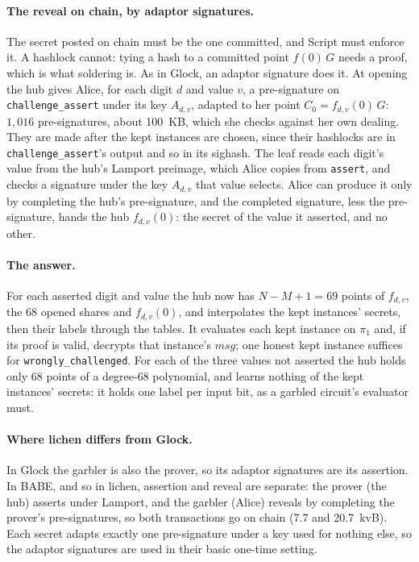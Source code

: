 \documentclass[11pt]{article}
\newcommand{\tx}[1]{\texttt{#1}}
\begin{document}
\paragraph{The reveal on chain, by adaptor signatures.} The secret
posted on chain must be the one committed, and Script must enforce it.
A hashlock cannot: tying a hash to a committed point $f(0)\,G$ needs a
proof, which is what soldering is. As in Glock, an adaptor signature
does it. At opening the hub gives Alice, for each digit $d$ and value
$v$, a pre-signature on \tx{challenge\_assert} under its key $A_{d,v}$,
adapted to her point $C_0 = f_{d,v}(0)\,G$: $1{,}016$ pre-signatures,
about 100~KB, which she checks against her own dealing. They are made
after the kept instances are chosen, since their hashlocks are in
\tx{challenge\_assert}'s output and so in its sighash. The leaf reads
each digit's value from the hub's Lamport preimage, which Alice copies
from \tx{assert}, and checks a signature under the key $A_{d,v}$ that
value selects. Alice can produce it only by completing the hub's
pre-signature, and the completed signature, less the pre-signature,
hands the hub $f_{d,v}(0)$: the secret of the value it asserted, and no
other.

\paragraph{The answer.} For each asserted digit and value the hub now
has $N - M + 1 = 69$ points of $f_{d,v}$, the 68 opened shares and
$f_{d,v}(0)$, and interpolates the kept instances' secrets, then their
labels through the tables. It evaluates each kept instance on $\pi_1$
and, if its proof is valid, decrypts that instance's $\mathit{msg}$; one
honest kept instance suffices for \tx{wrongly\_challenged}. For each of
the three values not asserted the hub holds only 68 points of a
degree-68 polynomial, and learns nothing of the kept instances' secrets:
it holds one label per input bit, as a garbled circuit's evaluator must.

\paragraph{Where lichen differs from Glock.} In Glock the garbler is
also the prover, so its adaptor signatures are its assertion. In BABE,
and so in lichen, assertion and reveal are separate: the prover (the
hub) asserts under Lamport, and the garbler (Alice) reveals by
completing the prover's pre-signatures, so both transactions go on chain
(7.7 and 20.7~kvB).
Each secret adapts exactly one pre-signature under a key used for
nothing else, so the adaptor signatures are used in their basic
one-time setting.
\end{document}
